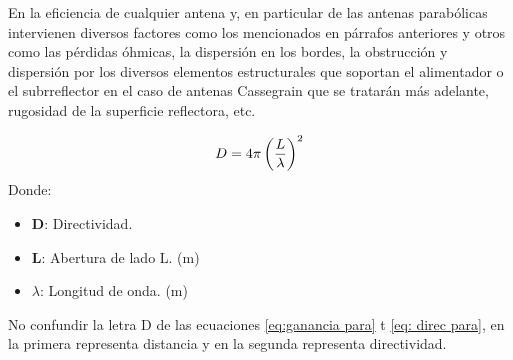\documentclass[
	12pt, %
	fleqn, %
	a4paper, %
	oneside, %
]{LegrandOrangeBook}
\begin{document}
En la eficiencia de cualquier antena y, en particular de las antenas parabólicas intervienen diversos factores como los mencionados en párrafos anteriores y otros como las pérdidas óhmicas, la dispersión en los bordes, la obstrucción y dispersión por los diversos elementos estructurales que soportan el alimentador o el subrreflector en el caso de antenas Cassegrain que se tratarán más adelante, rugosidad de la superficie reflectora, etc.
\begin{definition}[Directividad]
\begin{equation}
D=4\pi\left(\frac{L}{\lambda}\right)^2
\label{eq: direc para}
\end{equation}
Donde:
\begin{itemize}
\item \textbf{D}: Directividad.
\item \textbf{L}: Abertura de lado L. (m)
\item $\lambda$: Longitud de onda. (m)
\end{itemize}
\end{definition}
\begin{notation}
No confundir la letra D de las ecuaciones \ref{eq:ganancia para} t \ref{eq: direc para}, en la primera representa distancia y en la segunda representa directividad.
\end{notation}
\end{document}
